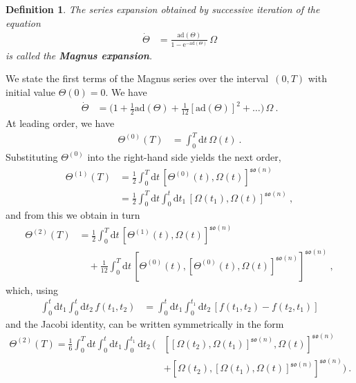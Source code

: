 \documentclass[10pt,a4paper]{article}
\theoremstyle{mytheorem}
\theoremstyle{mydefinition}
\newtheorem{definition}[theorem]{Definition}
\newcommand{\mydef}[1]{\textbf{\textit{#1}}}
\newcommand{\dt}{\mathrm{d}}
\newcommand{\ad}{\mathrm{ad}}
\newcommand{\fso}{\mathfrak{so}}
\begin{document}
\begin{definition}
The series expansion obtained by successive iteration of the equation
\begin{align*}
	\dot{\Theta}
	&= \frac{\ad(\Theta)}{1 - \mathrm{e}^{-\ad(\Theta)}}\,\Omega
\end{align*}
is called the \mydef{Magnus expansion}.
\end{definition}
We state the first terms of the Magnus series over the interval~$(0, T)$ with initial value $\Theta(0)=0$.
We have
\begin{align*}
	\dot{\Theta}
	&= 
	\Big(
		1 + \frac{1}{2}\ad(\Theta) 
		+ \frac{1}{12}[\ad(\Theta)]^2
		+ \ldots
	\Big)\,\Omega
	\ .
\end{align*}
At leading order, we have
\begin{align*}
	\Theta^{(0)}(T) &= \int_0^T\dt t\,\Omega(t)
	\ .
\end{align*}
Substituting $\Theta^{(0)}$ into the right-hand side yields the next order,
\begin{align*}
	\Theta^{(1)}(T)
	&=
	\frac{1}{2}\int_0^T\dt t\,
	[\Theta^{(0)}(t), \Omega(t)]^{\fso(n)}
	\nonumber\\	
	&=
	\frac{1}{2}\int_0^T\dt t\int_0^t\dt t_1 \,
	[\Omega(t_1), \Omega(t)]^{\fso(n)}
	\ ,
\end{align*}
and from this we obtain in turn
\begin{align*}
\Theta^{(2)}(T)
	&= 
	\frac{1}{2}
	\int_0^T\dt t\,
	[\Theta^{(1)}(t), \Omega(t)]^{\fso(n)}
	\nonumber\\
	&\quad
	+\frac{1}{12}
	\int_0^T\dt t\,
	[\Theta^{(0)}(t), [\Theta^{(0)}(t), \Omega(t)]^{\fso(n)}]^{\fso(n)}
	\ ,	
\end{align*}
which, using
\begin{align*}
	\int_0^t\dt t_1\int_0^t\dt t_2\, f(t_1,t_2)
	&=\int_0^t\dt t_1\int_0^{t_1}\dt t_2\,
	[f(t_1,t_2)-f(t_2,t_1)]
\end{align*}
and the Jacobi identity, can be written symmetrically in the form
\begin{align*}
\Theta^{(2)}(T) 
	=
	\frac{1}{6}
	\int_0^T\dt t\int_0^t\dt t_1\int_0^{t_1}\dt t_2\,
	\Big(
		&[[\Omega(t_2), \Omega(t_1)]^{\fso(n)}, \Omega(t)]^{\fso(n)}
		\nonumber\\
		&
		+ [\Omega(t_2), [\Omega(t_1), \Omega(t)]^{\fso(n)}]^{\fso(n)}
	\Big)
	\ .
\end{align*}
\end{document}
